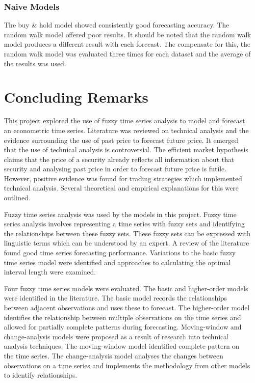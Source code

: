 \documentclass[12pt, oneside, a4paper]{article}
\theoremstyle{definition}
\begin{document}
\subsubsection{Naive Models}

The buy \& hold model showed consistently good forecasting accuracy. The random walk model offered poor results. It should be noted that the random walk model produces a different result with each forecast. The compensate for this, the random walk model was evaluated three times for each dataset and the average of the results was used.

\section{Concluding Remarks}


This project explored the use of fuzzy time series analysis to model and forecast an econometric time series. Literature was reviewed on technical analysis and the evidence surrounding the use of past price to forecast future price. It emerged that the use of technical analysis is controversial. The efficient market hypothesis claims that the price of a security already reflects all information about that security and analysing past price in order to forecast future price is futile. However, positive evidence was found for trading strategies which implemented technical analysis. Several theoretical and empirical explanations for this were outlined.

Fuzzy time series analysis was used by the models in this project. Fuzzy time series analysis involves representing a time series with fuzzy sets and identifying the relationships between these fuzzy sets. These fuzzy sets can be expressed with linguistic terms which can be understood by an expert. A review of the literature found good time series forecasting performance. Variations to the basic fuzzy time series model were identified and approaches to calculating the optimal interval length were examined.

Four fuzzy time series models were evaluated. The basic and higher-order models were identified in the literature. The basic model records the relationships between adjacent observations and uses these to forecast. The higher-order model identifies the relationship between multiple observations on the time series and allowed for partially complete patterns during forecasting. Moving-window and change-analysis models were proposed as a result of research into technical analysis techniques. The moving-window model identified complete pattern on the time series. The change-analysis model analyses the changes between observations on a time series and implements the methodology from other models to identify relationships.
\end{document}
